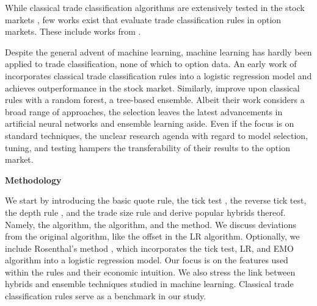 While classical trade classification algorithms are extensively tested in the stock markets \autocites{chakrabartyTradeClassificationAlgorithms2012}{finucaneDirectTestMethods2000}, few works exist that evaluate trade classification rules in option markets. These include works from \textcites{grauerOptionTradeClassification2022}{savickasInferringDirectionOption2003}.

Despite the general advent of machine learning, machine learning has hardly been applied to trade classification, none of which to option data. An early work of \textcite{rosenthalModelingTradeDirection2012} incorporates classical trade classification rules into a logistic regression model and achieves outperformance in the stock market. Similarly, \textcites{fedeniaMachineLearningCorporate2021}{ronenMachineLearningTrade2022} improve upon classical rules with a random forest, a tree-based ensemble. Albeit their work considers a broad range of approaches, the selection leaves the latest advancements in artificial neural networks and ensemble learning aside. Even if the focus is on standard techniques, the unclear research agenda with regard to model selection, tuning, and testing hampers the transferability of their results to the option market. 

\textbf{Methodology}

We start by introducing the basic quote rule, the tick test \autocite{hasbrouckTradesQuotesInventories1988}, the reverse tick test, the depth rule \autocite{grauerOptionTradeClassification2022}, and the trade size rule \autocite{grauerOptionTradeClassification2022} and derive popular hybrids thereof. Namely, the \autocite[LR,][]{leeInferringTradeDirection1991} algorithm, the \autocite[EMO,][]{ellisAccuracyTradeClassification2000} algorithm, and the  \autocite[CLVN,][]{chakrabartyTradeClassificationAlgorithms2007} method. We discuss deviations from the original algorithm, like the offset in the LR algorithm. Optionally, we include Rosenthal's method \autocite{rosenthalModelingTradeDirection2012}, which incorporates the tick test, LR, and EMO algorithm into a logistic regression model. Our focus is on the features used within the rules and their economic intuition. We also stress the link between hybrids and ensemble techniques studied in machine learning. Classical trade classification rules serve as a benchmark in our study.

